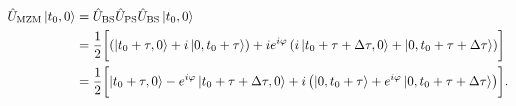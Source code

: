 \begin{equation}
	\begin{split}
		\hat{U}_\text{MZM}
		\ket{t_0,0}
		&=
		\hat{U}_\text{BS}
		\hat{U}_\text{PS}
		\hat{U}_\text{BS}
		\ket{t_0,0}
		\\
		&=
		\frac{1}{2}
		\biggl[
			\left(
				\ket{t_0+\tau,0}
				+
				i\ket{0,t_0+\tau}
			\right)
			+
			ie^{i\varphi}
			\left(
				i\ket{t_0+\tau+\Delta\tau,0}
				+
				\ket{0,t_0+\tau+\Delta\tau}
			\right)
		\biggr]
		\\
		&=
		\frac{1}{2}
		\biggl[
			\ket{t_0+\tau,0}
			-
			e^{i\varphi}
			\ket{t_0+\tau+\Delta\tau,0}
			+
			i
			\left(
				\ket{0,t_0+\tau}
				+
				e^{i\varphi}
				\ket{0,t_0+\tau+\Delta\tau}
			\right)
		\biggr]
		.
	\end{split}
	\label{eq:mzi_asymmetric}
\end{equation}

